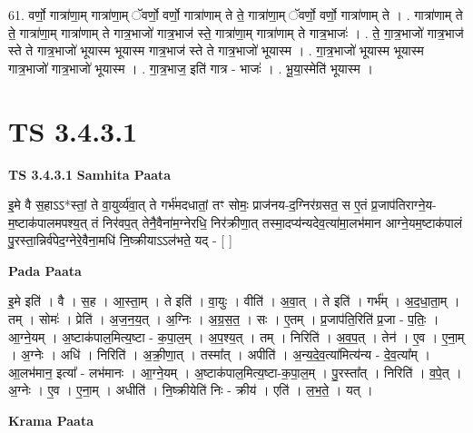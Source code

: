 \documentclass[17pt]{extarticle}
\begin{document}
61. वर्णो॒ गात्रा॑णा॒म् गात्रा॑णा॒म् ॅवर्णो॒ वर्णो॒ गात्रा॑णाम् ते ते॒ गात्रा॑णा॒म् ॅवर्णो॒ वर्णो॒ गात्रा॑णाम् ते । . गात्रा॑णाम् ते ते॒ गात्रा॑णा॒म् गात्रा॑णाम् ते गात्र॒भाजो॑ गात्र॒भाज॑ स्ते॒ गात्रा॑णा॒म् गात्रा॑णाम् ते गात्र॒भाजः॑ । . ते॒ गा॒त्र॒भाजो॑ गात्र॒भाज॑ स्ते ते गात्र॒भाजो॑ भूयास्म भूयास्म गात्र॒भाज॑ स्ते ते गात्र॒भाजो॑ भूयास्म । . गा॒त्र॒भाजो॑ भूयास्म भूयास्म गात्र॒भाजो॑ गात्र॒भाजो॑ भूयास्म । . गा॒त्र॒भाज॒ इति॑ गात्र - भाजः॑ । . भू॒या॒स्मेति॑ भूयास्म । \newline
\pagebreak
{}

\section{ TS 3.4.3.1 }

\textbf{TS 3.4.3.1 } \newline
\textbf{Samhita Paata} \newline

इ॒मे वै स॒हाऽऽ*स्तां॒ ते वा॒युर्व्य॑वा॒त् ते गर्भ॑मदधातां॒ तꣳ सोमः॒ प्राज॑नय-द॒ग्निर॑ग्रसत॒ स ए॒तं प्र॒जाप॑तिराग्ने॒य-म॒ष्टाक॑पालमपश्य॒त् तं निर॑वप॒त् तेनै॒वैना॑म॒ग्नेरधि॒ निर॑क्रीणा॒त् तस्मा॒दप्य॑न्यदेव॒त्या॑मा॒लभ॑मान आग्ने॒यम॒ष्टाक॑पालं पु॒रस्ता॒न्निर्व॑पेद॒ग्नेरे॒वैना॒मधि॑ नि॒ष्क्रीयाऽऽल॑भते॒ यद् - [  ] \newline

\textbf{Pada Paata} \newline

इ॒मे इति॑ । वै । स॒ह । आ॒स्ता॒म् । ते इति॑ । वा॒युः । वीति॑ । अ॒वा॒त् । ते इति॑ । गर्भ᳚म् । अ॒द॒धा॒ता॒म् । तम् । सोमः॑ । प्रेति॑ । अ॒ज॒न॒य॒त् । अ॒ग्निः । अ॒ग्र॒स॒त॒ । सः । ए॒तम् । प्र॒जाप॑ति॒रिति॑ प्र॒जा - प॒तिः॒ । आ॒ग्ने॒यम् । अ॒ष्टाक॑पाल॒मित्य॒ष्टा - क॒पा॒ल॒म् । अ॒प॒श्य॒त् । तम् । निरिति॑ । अ॒व॒प॒त् । तेन॑ । ए॒व । ए॒ना॒म् । अ॒ग्नेः । अधि॑ । निरिति॑ । अ॒क्री॒णा॒त् । तस्मा᳚त् । अपीति॑ । अ॒न्य॒दे॒व॒त्या॑मित्य॑न्य - दे॒व॒त्या᳚म् । आ॒लभ॑मान॒ इत्या᳚ - लभ॑मानः । आ॒ग्ने॒यम् । अ॒ष्टाक॑पाल॒मित्य॒ष्टा-क॒पा॒ल॒म् । पु॒रस्ता᳚त् । निरिति॑ । व॒पे॒त् । अ॒ग्नेः । ए॒व । ए॒ना॒म् । अधीति॑ । नि॒ष्क्रीयेति॑ निः - क्रीय॑ । एति॑ । ल॒भ॒ते॒ । यत् ।  \newline


\textbf{Krama Paata} \newline
\end{document}
